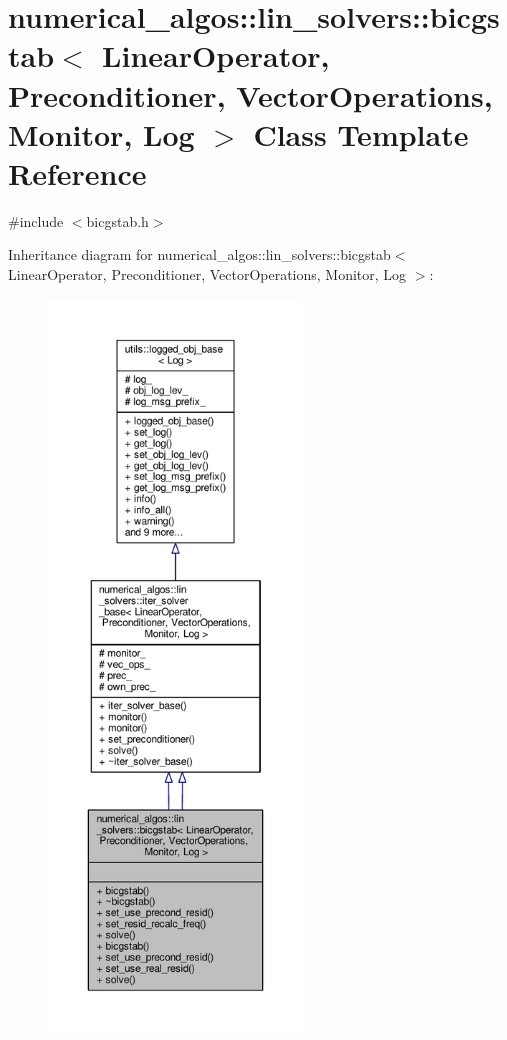 \hypertarget{classnumerical__algos_1_1lin__solvers_1_1bicgstab}{\section{numerical\-\_\-algos\-:\-:lin\-\_\-solvers\-:\-:bicgstab$<$ Linear\-Operator, Preconditioner, Vector\-Operations, Monitor, Log $>$ Class Template Reference}
\label{classnumerical__algos_1_1lin__solvers_1_1bicgstab}
}


{\ttfamily \#include $<$bicgstab.\-h$>$}



Inheritance diagram for numerical\-\_\-algos\-:\-:lin\-\_\-solvers\-:\-:bicgstab$<$ Linear\-Operator, Preconditioner, Vector\-Operations, Monitor, Log $>$\-:
\nopagebreak
\begin{figure}[H]
\begin{center}
\leavevmode
\includegraphics[height=550pt]{classnumerical__algos_1_1lin__solvers_1_1bicgstab__inherit__graph}
\end{center}
\end{figure}


